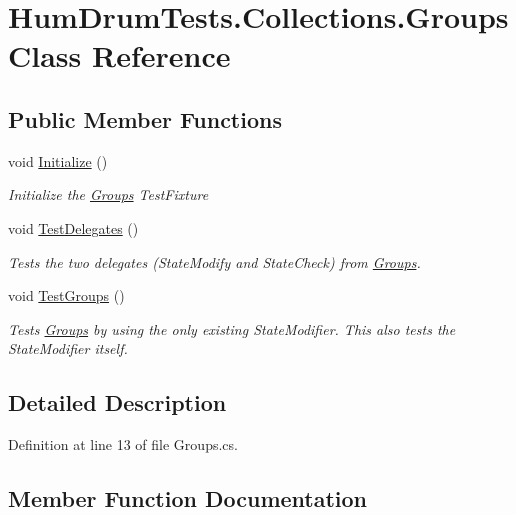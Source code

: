 \hypertarget{classHumDrumTests_1_1Collections_1_1Groups}{}\section{Hum\+Drum\+Tests.\+Collections.\+Groups Class Reference}
\label{classHumDrumTests_1_1Collections_1_1Groups}
\subsection*{Public Member Functions}
\begin{DoxyCompactItemize}
\item 
void \hyperlink{classHumDrumTests_1_1Collections_1_1Groups_adb48b08d63e688ba5c76eded91de1c82}{Initialize} ()
\begin{DoxyCompactList}\small\item\em Initialize the \hyperlink{classHumDrumTests_1_1Collections_1_1Groups}{Groups} Test\+Fixture \end{DoxyCompactList}\item 
void \hyperlink{classHumDrumTests_1_1Collections_1_1Groups_a78213de4c9b4e5440c7fdb702b03b885}{Test\+Delegates} ()
\begin{DoxyCompactList}\small\item\em Tests the two delegates (State\+Modify and State\+Check) from \hyperlink{classHumDrumTests_1_1Collections_1_1Groups}{Groups}. \end{DoxyCompactList}\item 
void \hyperlink{classHumDrumTests_1_1Collections_1_1Groups_a1cbc36b01deb1bd68651bd3bc58be570}{Test\+Groups} ()
\begin{DoxyCompactList}\small\item\em Tests \hyperlink{classHumDrumTests_1_1Collections_1_1Groups}{Groups} by using the only existing State\+Modifier. This also tests the State\+Modifier itself. \end{DoxyCompactList}\end{DoxyCompactItemize}


\subsection{Detailed Description}


Definition at line 13 of file Groups.\+cs.



\subsection{Member Function Documentation}
\hypertarget{classHumDrumTests_1_1Collections_1_1Groups_adb48b08d63e688ba5c76eded91de1c82}{}
